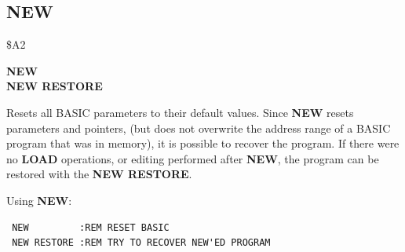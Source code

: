 \subsection{NEW}
\begin{description}[leftmargin=2cm,style=nextline]
\item [Token:] \$A2
\item [Format:] {\bf NEW} \\
                {\bf NEW RESTORE}
\item [Usage:]  Resets all BASIC parameters to their default values.
                Since {\bf NEW} resets parameters and pointers,
                (but does not overwrite the address
                range of a BASIC program that was in memory),
                it is possible to recover the
                program. If there were no {\bf LOAD} operations,
                or editing performed after {\bf NEW}, the program
                can be restored with the {\bf NEW RESTORE}.
\item [Examples:] Using {\bf NEW}:
\begin{tcolorbox}[colback=black,coltext=white]
\verbatimfont{\codefont}
\begin{verbatim}
 NEW         :REM RESET BASIC
 NEW RESTORE :REM TRY TO RECOVER NEW'ED PROGRAM
\end{verbatim}
\end{tcolorbox}
\end{description}


\newpage
